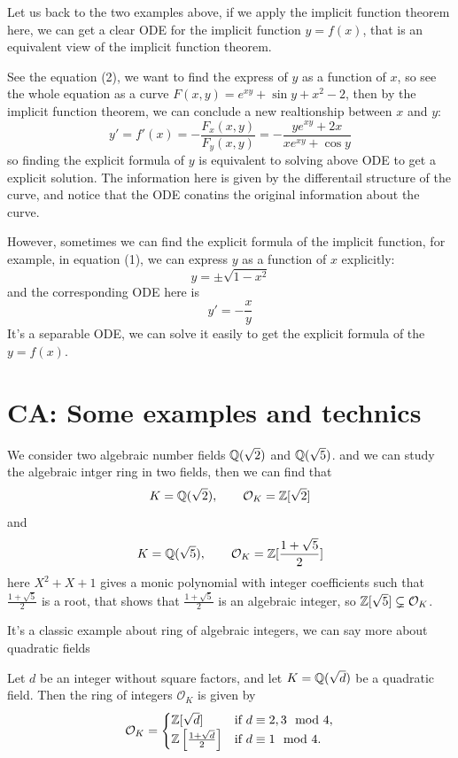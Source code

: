 Let us back to the two examples above, if we apply the implicit function theorem here, we can get a clear ODE for the implicit function \(y=f(x)\), that is an equivalent view of the implicit function theorem.
\begin{example}
    See the equation (2), we want to find the express of \(y\) as a function of \(x\), so see the whole equation as a curve \(F(x,y) = e^{xy} + \sin y + x^2 - 2\), then by the implicit function theorem, we can conclude a new realtionship between \(x\) and \(y\):
     \[y' = f'(x) = -\frac{F_x(x,y)}{F_y(x,y)} = -\frac{ye^{xy} + 2x}{xe^{xy} + \cos y}\]
    so finding the explicit formula of \(y\) is equivalent to solving above ODE to get a explicit solution. The information here is given by the differentail structure of the curve, and notice that the ODE conatins the original information about the curve.

    However, sometimes we can find the explicit formula of the implicit function, for example, in equation (1), we can express \(y\) as a function of \(x\) explicitly:
    \[y = \pm \sqrt{1-x^2}\]
    and the corresponding ODE here is \[y' = -\frac{x}{y}\]
    It's a separable ODE, we can solve it easily to get the explicit formula of the \(y=f(x)\).
    
\end{example}

\section{ CA: Some examples and technics}
\begin{example}
    We consider two algebraic number fields \(\mathbb{Q}(\sqrt{2})\) and \(\mathbb{Q}(\sqrt{5})\). and we can study the algebraic intger ring in two fields, then we can find that
    \[K = \mathbb{Q}(\sqrt{2}), \qquad \mathcal{O}_K  = \mathbb{Z}[\sqrt{2}]\]
    and 
    \[K = \mathbb{Q}(\sqrt{5}), \qquad \mathcal{O}_K  = \mathbb{Z}[\frac{1+\sqrt{5}}{2}]\]
    here \(X^2+X+1\) gives a monic polynomial with integer coefficients such that \(\frac{1+\sqrt{5}}{2}\) is a root, that shows that \(\frac{1+\sqrt{5}}{2}\) is an algebraic integer, so \(\mathbb{Z}[\sqrt{5}] \subsetneq \mathcal{O}_K\).
\end{example}

It's a classic example about ring of algebraic integers, we can say more about quadratic fields

\begin{theorem}
    Let \(d\) be an integer without square factors, and let \(K = \mathbb{Q}(\sqrt{d})\) be a quadratic field. Then the ring of integers \(\mathcal{O}_K\) is given by
    \[
    \mathcal{O}_K = 
    \begin{cases}
        \mathbb{Z}[\sqrt{d}] & \text{if } d \equiv 2, 3 \mod 4, \\
        \mathbb{Z}\left[\frac{1 + \sqrt{d}}{2}\right] & \text{if } d \equiv 1 \mod 4.
    \end{cases}
    \]
\end{theorem}

